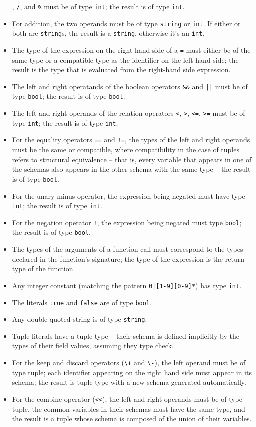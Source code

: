 \documentclass{WigReport}
\begin{document}
\begin{itemize}
      {\tt *}, {\tt /}, and {\tt \%} must be of type {\tt int}; the result 
      is of type {\tt int}.
\item For addition, the two operands must be of type {\tt string} or 
      {\tt int}. If either or both are {\tt string}s, the result is a 
      {\tt string}, otherwise it's an {\tt int}.
\item The type of the expression on the right hand side of a {\tt =} must 
      either be of the same type or a compatible type as the identifier on 
      the left hand side; the result is the type that is evaluated from the
      right-hand side expression.
\item The left and right operatands of the boolean operators {\tt \&\&} and
      {\tt ||} must be of type {\tt bool}; the result is of type {\tt bool}.
\item The left and right operands of the relation operators {\tt <}, 
      {\tt >}, {\tt <=}, {\tt >=} must be of type {\tt int}; the result is
      of type {\tt int}.
\item For the equality operators {\tt ==} and {\tt !=}, the types of the
      left and right operands must be the same or compatible, where
      compatibility in the case of tuples refers to structural equivalence 
      -- that is, every variable that appears in one of the schemas also 
      appears in the other schema with the same type -- the result is of
      type {\tt bool}.
\item For the unary minus operator, the expression being negated must have
      type {\tt int}; the result is of type {\tt int}.
\item For the negation operator {\tt !}, the expression being negated must
      type {\tt bool}; the result is of type {\tt bool}.
\item The types of the arguments of a function call must correspond to the
      types declared in the function's signature; the type of the 
      expression is the return type of the function.
\item Any integer constant (matching the pattern
      {\tt 0|{[}1-9{]}{[}0-9{]}*}) has type {\tt int}.
\item The literals {\tt true} and {\tt false} are of type {\tt bool}. 
\item Any double quoted string is of type {\tt string}.  
\item Tuple literals have a tuple type -- their schema is defined 
      implicitly by the types of their field values, assuming they type 
      check.
\item For the keep and discard operators ({\tt \textbackslash +} and 
      {\tt \textbackslash -}), the left operand must be of type tuple; each 
      identifier appearing on the right hand side must appear in its 
      schema; the result is tuple type with a new schema generated 
      automatically. 
\item For the combine operator ({\tt <<}), the left and right operands must
      be of type tuple, the common variables in their schemas must have the
      same type, and the result is a tuple whose schema is composed of the
      union of their variables.
\end{itemize}
\end{document}
